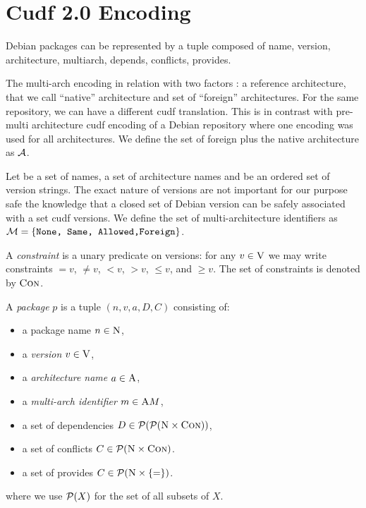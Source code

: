 \section{Cudf 2.0 Encoding}

Debian packages can be represented by a tuple composed of name,
version, architecture, multiarch, depends, conflicts, provides.

The multi-arch encoding in relation with two factors : a reference
architecture, that we call ``native'' architecture and set of
``foreign'' architectures. For the same repository, we can have a
different cudf translation. This is in contrast with pre-multi
architecture cudf encoding of a Debian repository where one encoding
was used for all architectures. We define the set of foreign plus the
native architecture as $\cal{A}$.

Let \names{} be a set of names, \architectures{} a set of architecture
names and \versions{} be an ordered set of version strings. The exact
nature of versions are not important for our purpose safe the knowledge
that a closed set of Debian version can be safely associated with a
set cudf versions. We define the set of multi-architecture identifiers
as $\cal{M} = \{ \texttt{None, Same, Allowed,Foreign} \}$.

A \emph{constraint} is a unary predicate on versions: for any $v \in
\textsc{V}$ we may write constraints $=v$, $\neq v$, $<v$, $>v$, $\leq
v$, and $\geq v$.  The set of constraints is denoted by $\textsc{Con}$.

\begin{definition} 
  A \emph{package} $p$ is a tuple $(n,v,a,D,C)$ consisting of:
  \begin{itemize}
    \item a {\rm package name} $n \in \textsc{N}$,
    \item a {\em version} $v \in \textsc{V}$,
    \item a {\em architecture name} $a \in \textsc{A}{}$,
    \item a {\em multi-arch identifier} $m \in \textsc{A}{M}$,
    \item a set of dependencies $D \in\mathcal{P}(\mathcal{P}(\textsc{N}\times\textsc{Con}))$,
    \item a set of conflicts $C \in\mathcal{P}(\textsc{N}\times\textsc{Con})$.
    \item a set of provides $C \in\mathcal{P}(\textsc{N}\times \{ = \} )$.
  \end{itemize}
\end{definition}
where we use $\mathcal{P}(X)$ for the set of all subsets of $X$.

